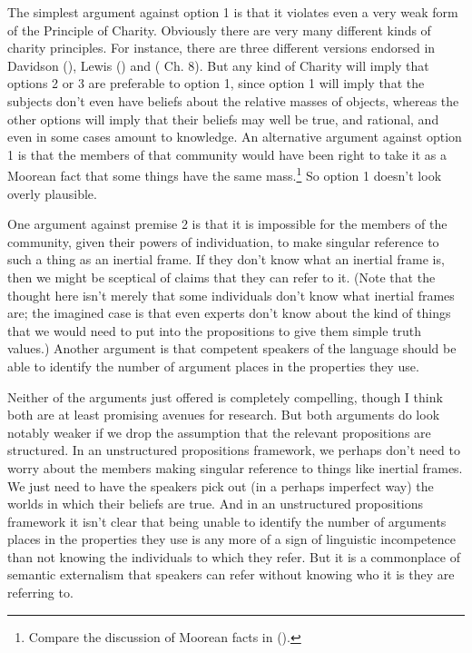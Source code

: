 \documentclass[
  11pt,
  letterpaper,
  DIV=11,
  numbers=noendperiod,
  twoside]{scrartcl}
\begin{document}
The simplest argument against option 1 is that it violates even a very
weak form of the Principle of Charity. Obviously there are very many
different kinds of charity principles. For instance, there are three
different versions endorsed in Davidson
(), Lewis
() and
( Ch. 8). But
any kind of Charity will imply that options 2 or 3 are preferable to
option 1, since option 1 will imply that the subjects don't even have
beliefs about the relative masses of objects, whereas the other options
will imply that their beliefs may well be true, and rational, and even
in some cases amount to knowledge. An alternative argument against
option 1 is that the members of that community would have been right to
take it as a Moorean fact that some things have the same
mass.\footnote{Compare the discussion of Moorean facts in
  ().} So option 1 doesn't
look overly plausible.

One argument against premise 2 is that it is impossible for the members
of the community, given their powers of individuation, to make singular
reference to such a thing as an inertial frame. If they don't know what
an inertial frame is, then we might be sceptical of claims that they can
refer to it. (Note that the thought here isn't merely that some
individuals don't know what inertial frames are; the imagined case is
that even experts don't know about the kind of things that we would need
to put into the propositions to give them simple truth values.) Another
argument is that competent speakers of the language should be able to
identify the number of argument places in the properties they use.

Neither of the arguments just offered is completely compelling, though I
think both are at least promising avenues for research. But both
arguments do look notably weaker if we drop the assumption that the
relevant propositions are structured. In an unstructured propositions
framework, we perhaps don't need to worry about the members making
singular reference to things like inertial frames. We just need to have
the speakers pick out (in a perhaps imperfect way) the worlds in which
their beliefs are true. And in an unstructured propositions framework it
isn't clear that being unable to identify the number of arguments places
in the properties they use is any more of a sign of linguistic
incompetence than not knowing the individuals to which they refer. But
it is a commonplace of semantic externalism that speakers can refer
without knowing who it is they are referring to.
\end{document}
